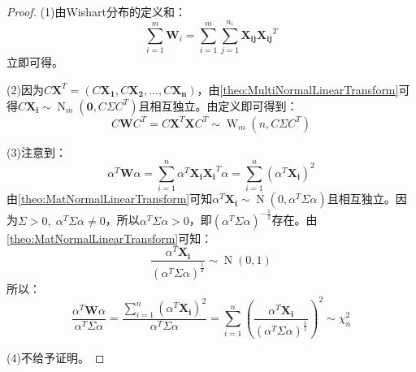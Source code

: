 \begin{proof}
	(1)由Wishart分布的定义和：
	\begin{equation*}
		\sum_{i=1}^{m}\mathbf{W}_i=\sum_{i=1}^{m}\sum_{j=1}^{n_i}\mathbf{X_{ij}}\mathbf{X_{ij}}^T
	\end{equation*}
	立即可得。\par
	(2)因为$C\mathbf{X}^T=(C\mathbf{X_1},C\mathbf{X_2},\dots,C\mathbf{X_n})$，由\cref{theo:MultiNormalLinearTransform}可得$C\mathbf{X_i}\sim\operatorname{N}_m(\mathbf{0},C\Sigma C^T)$且相互独立。由定义即可得到：
	\begin{equation*}
		C\mathbf{W}C^T=C\mathbf{X}^T\mathbf{X}C^T\sim\operatorname{W}_m(n,C\Sigma C^T)
	\end{equation*}\par
	(3)注意到：
	\begin{equation*}
		\alpha^T\mathbf{W}\alpha=\sum_{i=1}^{n}\alpha^T\mathbf{X_i}\mathbf{X_i}^T\alpha=\sum_{i=1}^{n}(\alpha^T\mathbf{X_i})^2
	\end{equation*}
	由\cref{theo:MatNormalLinearTransform}可知$\alpha^T\mathbf{X_i}\sim\operatorname{N}(0,\alpha^T\Sigma\alpha)$且相互独立。因为$\Sigma>0,\;\alpha^T\Sigma\alpha\ne0$，所以$\alpha^T\Sigma\alpha>0$，即$(\alpha^T\Sigma\alpha)^{-\frac{1}{2}}$存在。由\cref{theo:MatNormalLinearTransform}可知：
	\begin{equation*}
		\frac{\alpha^T\mathbf{X_i}}{(\alpha^T\Sigma\alpha)^{\frac{1}{2}}}\sim\operatorname{N}(0,1)
	\end{equation*}
	所以：
	\begin{equation*}
		\frac{\alpha^T\mathbf{W}\alpha}{\alpha^T\Sigma\alpha}=\frac{\sum\limits_{i=1}^{n}(\alpha^T\mathbf{X_i})^2}{\alpha^T\Sigma\alpha}=\sum_{i=1}^{n}\left(\frac{\alpha^T\mathbf{X_i}}{(\alpha^T\Sigma\alpha)^{\frac{1}{2}}}\right)^2\sim\chi_n^2
	\end{equation*}\par
	(4)不给予证明。
\end{proof}

